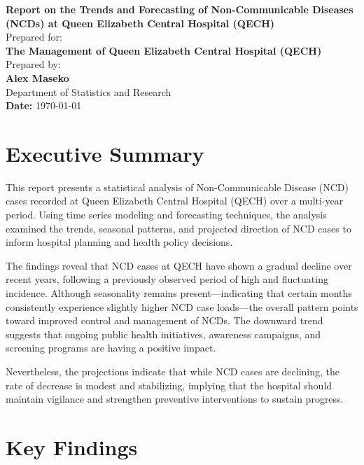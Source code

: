 \documentclass[12pt,a4paper]{report}
\begin{document}
\begin{titlepage}
    \centering
    \vspace*{2cm}
    {\Large \textbf{Report on the Trends and Forecasting of Non-Communicable Diseases (NCDs) at Queen Elizabeth Central Hospital (QECH)}}\\[1.5cm]
    {\large Prepared for:}\\
    \textbf{The Management of Queen Elizabeth Central Hospital (QECH)}\\[0.5cm]
    {\large Prepared by:}\\
    \textbf{Alex Maseko}\\
    Department of Statistics and Research\\[0.3cm]
    \textbf{Date:} \today
    \vfill
\end{titlepage}

\chapter*{Executive Summary}

\noindent
This report presents a statistical analysis of Non-Communicable Disease (NCD) cases recorded at Queen Elizabeth Central Hospital (QECH) over a multi-year period. Using time series modeling and forecasting techniques, the analysis examined the trends, seasonal patterns, and projected direction of NCD cases to inform hospital planning and health policy decisions.

\noindent The findings reveal that NCD cases at QECH have shown a gradual decline over recent years, following a previously observed period of high and fluctuating incidence. Although seasonality remains present—indicating that certain months consistently experience slightly higher NCD case loads—the overall pattern points toward improved control and management of NCDs. The downward trend suggests that ongoing public health initiatives, awareness campaigns, and screening programs are having a positive impact.

\noindent Nevertheless, the projections indicate that while NCD cases are declining, the rate of decrease is modest and stabilizing, implying that the hospital should maintain vigilance and strengthen preventive interventions to sustain progress.

\chapter*{Key Findings}
\end{document}
